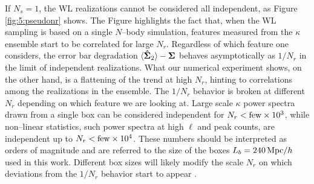 If $N_s=1$, the WL realizations cannot be considered all independent, as Figure \ref{fig:5:pseudonr} shows. The Figure highlights the fact that, when the WL sampling is based on a single $N$--body simulation, features measured from the $\kappa$ ensemble start to be correlated for large $N_r$. Regardless of which feature one considers, the error bar degradation $\langle\mathbf{\hat{\Sigma}}_2\rangle-\mathbf{\Sigma}$ behaves asymptotically as $1/N_r$ in the limit of independent realizations. What our numerical experiment shows, on the other hand, is a flattening of the trend at high $N_r$, hinting to correlations among the realizations in the ensemble. The $1/N_r$ behavior is broken at different $N_r$ depending on which feature we are looking at. Large scale $\kappa$ power spectra drawn from a single box can be considered independent for $N_r<{\rm few}\times 10^3$, while non--linear statistics, such power spectra at high $\ell$ and peak counts, are independent up to $N_r<{\rm few}\times 10^4$. These numbers should be interpreted as orders of magnitude and are referred to the size of the boxes $L_b=240\,{\rm Mpc}/h$ used in this work. Different box sizes will likely modify the scale $N_r$ on which deviations from the $1/N_r$ behavior start to appear \citep{NbodyLB,PetriVariance}.

